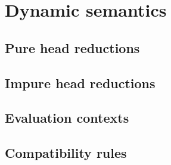 \clearpage

\section{Dynamic semantics}\label{app:dynamic-semantics}

\subsection{Pure head reductions}

\begin{adjustwidth}{0cm}{-5cm}
\end{adjustwidth}


\subsection{Impure head reductions}

\begin{adjustwidth}{0cm}{-5cm}
\end{adjustwidth}


\subsection{Evaluation contexts}

\begin{adjustwidth}{0cm}{-5cm}
\begin{mathparpagebreakable}
\end{mathparpagebreakable}
\end{adjustwidth}





\clearpage

\begin{adjustwidth}{-5cm}{0cm}
\section{Compatibility rules}\label{sec:compatibility-rules}
\end{adjustwidth}
